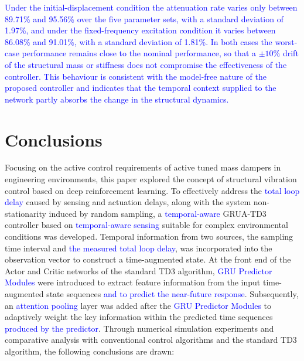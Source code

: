 \documentclass[review]{elsarticle}
\begin{document}
\textcolor{blue}{Under the initial-displacement condition the attenuation rate varies only between 89.71\% and 95.56\% over the five parameter sets, with a standard deviation of 1.97\%, and under the fixed-frequency excitation condition it varies between 86.08\% and 91.01\%, with a standard deviation of 1.81\%. In both cases the worst-case performance remains close to the nominal performance, so that a $\pm10\%$ drift of the structural mass or stiffness does not compromise the effectiveness of the controller. This behaviour is consistent with the model-free nature of the proposed controller and indicates that the temporal context supplied to the network partly absorbs the change in the structural dynamics.}


\section{Conclusions}
\label{sec:conclusions}

Focusing on the active control requirements of active tuned mass dampers in engineering environments, this paper explored the concept of structural vibration control based on deep reinforcement learning.
To effectively address the \textcolor{blue}{total loop delay} caused by sensing and actuation delays, along with the system non-stationarity induced by random sampling, a \textcolor{blue}{temporal-aware} GRUA-TD3 controller based on \textcolor{blue}{temporal-aware sensing} suitable for complex environmental conditions was developed.
Temporal information from two sources, the sampling time interval and \textcolor{blue}{the measured total loop delay}, was incorporated into the observation vector to construct a time-augmented state.
At the front end of the Actor and Critic networks of the standard TD3 algorithm, \textcolor{blue}{GRU Predictor Modules} were introduced to extract feature information from the input time-augmented state sequences \textcolor{blue}{and to predict the near-future response}.
Subsequently, an \textcolor{blue}{attention pooling} layer was added after the \textcolor{blue}{GRU Predictor Modules} to adaptively weight the key information within the predicted time sequences \textcolor{blue}{produced by the predictor}.
Through numerical simulation experiments and comparative analysis with conventional control algorithms and the standard TD3 algorithm, the following conclusions are drawn:
\end{document}
